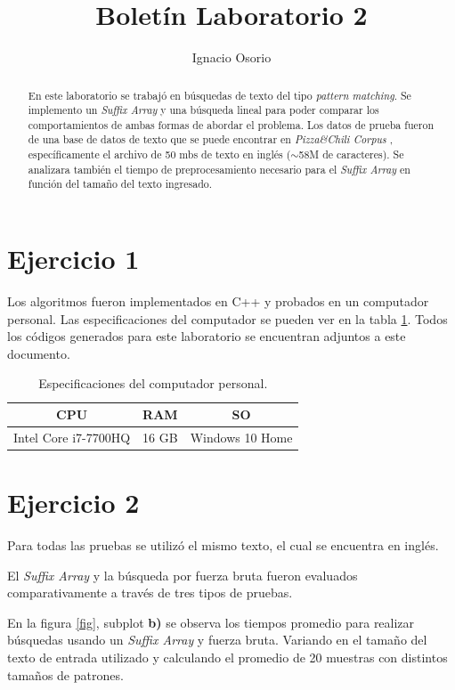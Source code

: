 \documentclass[]{article}
\title{Boletín Laboratorio 2}
\author{Ignacio Osorio}
\begin{document}
\maketitle

\begin{abstract}

En este laboratorio se trabajó en búsquedas de texto del tipo \emph{pattern matching}. Se implemento un \emph{Suffix Array} \cite{SuffixArray} y una búsqueda lineal para poder comparar los comportamientos de ambas formas de abordar el problema. Los datos de prueba fueron de una base de datos de texto que se puede encontrar en \emph{Pizza\&Chili Corpus} \cite{data}, específicamente el archivo de 50 mbs de texto en inglés ($\sim$58M de caracteres). Se analizara también el tiempo de preprocesamiento necesario para el \emph{Suffix Array} en función del tamaño del texto ingresado.

\end{abstract}

\section{Ejercicio 1}
Los algoritmos fueron implementados en C++ y probados en un computador personal. Las especificaciones del computador se pueden ver en la tabla \ref{tab:spec}. Todos los códigos generados para este laboratorio se encuentran adjuntos a este documento.

\begin{table}[]
	\centering
	\caption{Especificaciones del computador personal.}
	\label{tab:spec}
	\begin{tabular}{|c|c|c|}
		\hline
		CPU 					& RAM 			& SO 	 				\\ \hline
		Intel Core i7-7700HQ    & 16 GB        	& Windows 10 Home        \\ \hline
	\end{tabular}
\end{table}


\section{Ejercicio 2}

Para todas las pruebas se utilizó el mismo texto, el cual se encuentra en inglés.

El \emph{Suffix Array} y la búsqueda por fuerza bruta fueron evaluados comparativamente a través de tres tipos de pruebas. 

En la figura \ref{fig}, subplot \textbf{b)} se observa los tiempos promedio para realizar búsquedas usando un \emph{Suffix Array} y fuerza bruta. Variando en el tamaño del texto de entrada utilizado y calculando el promedio de 20 muestras con distintos tamaños de patrones.
\end{document}
